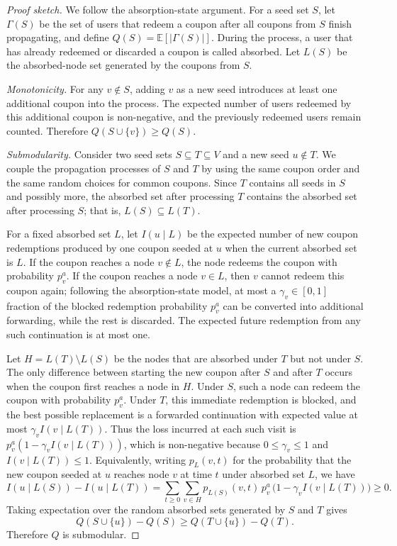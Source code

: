 \documentclass[sigconf]{acmart}
\newcommand{\E}{\mathbb{E}}
\begin{document}
\begin{proof}[Proof sketch]
We follow the absorption-state argument.
For a seed set $S$, let $\Gamma(S)$ be the set of users that redeem a
coupon after all coupons from $S$ finish propagating, and define
$Q(S)=\E[|\Gamma(S)|]$.
During the process, a user that has already redeemed or discarded a
coupon is called absorbed.
Let $L(S)$ be the absorbed-node set generated by the coupons from $S$.

\textit{Monotonicity.}
For any $v\notin S$, adding $v$ as a new seed introduces at least one
additional coupon into the process.
The expected number of users redeemed by this additional coupon is
non-negative, and the previously redeemed users remain counted.
Therefore $Q(S\cup\{v\})\geq Q(S)$.

\textit{Submodularity.}
Consider two seed sets $S\subseteq T\subseteq V$ and a new seed
$u\notin T$.
We couple the propagation processes of $S$ and $T$ by using the same
coupon order and the same random choices for common coupons.
Since $T$ contains all seeds in $S$ and possibly more, the absorbed set
after processing $T$ contains the absorbed set after processing $S$; that
is, $L(S)\subseteq L(T)$.

For a fixed absorbed set $L$, let $I(u\mid L)$ be the expected number of
new coupon redemptions produced by one coupon seeded at $u$ when the
current absorbed set is $L$.
If the coupon reaches a node $v\notin L$, the node redeems the coupon
with probability $p_v^a$.
If the coupon reaches a node $v\in L$, then $v$ cannot redeem this coupon
again; following the absorption-state model, at most a
$\gamma_v\in[0,1]$ fraction of the blocked redemption probability
$p_v^a$ can be converted into additional forwarding, while the rest is
discarded.
The expected future redemption from any such continuation is at most
one.

Let $H=L(T)\setminus L(S)$ be the nodes that are absorbed under $T$ but
not under $S$.
The only difference between starting the new coupon after $S$ and after
$T$ occurs when the coupon first reaches a node in $H$.
Under $S$, such a node can redeem the coupon with probability $p_v^a$.
Under $T$, this immediate redemption is blocked, and the best possible
replacement is a forwarded continuation with expected value at most
$\gamma_v I(v\mid L(T))$.
Thus the loss incurred at each such visit is
$p_v^a(1-\gamma_v I(v\mid L(T)))$, which is non-negative because
$0\leq\gamma_v\leq 1$ and $I(v\mid L(T))\leq 1$.
Equivalently, writing $p_L(v,t)$ for the probability that the new coupon
seeded at $u$ reaches node $v$ at time $t$ under absorbed set $L$, we have
\[
  I(u\mid L(S))-I(u\mid L(T))
  =
  \sum_{t\geq 0}\sum_{v\in H}
    p_{L(S)}(v,t)\,p_v^a\,
    \bigl(1-\gamma_v I(v\mid L(T))\bigr)
  \geq 0 .
\]
Taking expectation over the random absorbed sets generated by $S$ and
$T$ gives
\[
  Q(S\cup\{u\})-Q(S)
  \geq
  Q(T\cup\{u\})-Q(T).
\]
Therefore $Q$ is submodular.
\end{proof}
\end{document}
